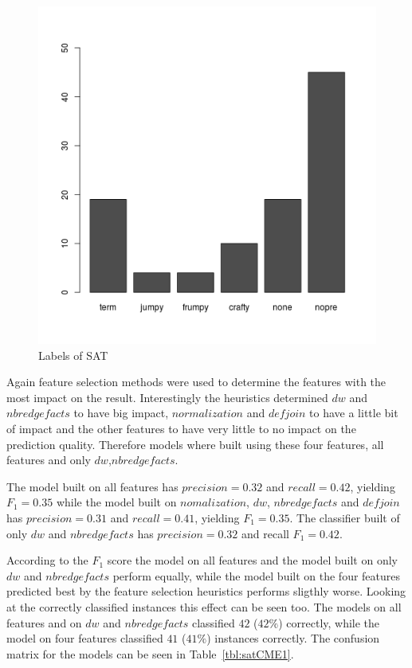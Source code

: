 \begin{figure}[h]
	\center
	\includegraphics[scale=\figscale]{figures/satLabels.png}
	\caption{Labels of SAT\label{fig:satLabelsE1}}
\end{figure}

Again feature selection methods were used to determine the features with the most impact on the result. Interestingly the heuristics determined \inline$dw$ and \inline$nbredgefacts$ to have big impact, \inline$normalization$ and \inline$defjoin$ to have a little bit of impact and the other features to have very little to no impact on the prediction quality. Therefore models where built using these four features, all features  and only \inline$dw$,\inline$nbredgefacts$.

The model built on all features has $precision=0.32$ and $recall=0.42$, yielding $F_1=0.35$ while the model built on \inline$nomalization$, \inline$dw$, \inline$nbredgefacts$ and \inline$defjoin$ has $precision=0.31$ and $recall=0.41$, yielding $F_1 =0.35$. The classifier built of only \inline$dw$ and \inline$nbredgefacts$ has $precision=0.32$ and recall $F_1=0.42$.

According to the $F_1$ score the model on all features and the model built on only $dw$ and $nbredgefacts$ perform equally, while the model built on the four features predicted best by the feature selection heuristics performs sligthly worse. Looking at the correctly classified instances this effect can be seen too. The models on all features and on \inline$dw$ and \inline$nbredgefacts$ classified $42$ ($42\%$) correctly, while the model on four features classified $41$ ($41\%$) instances correctly. The confusion matrix for the models can be seen in Table~\ref{tbl:satCME1}.

